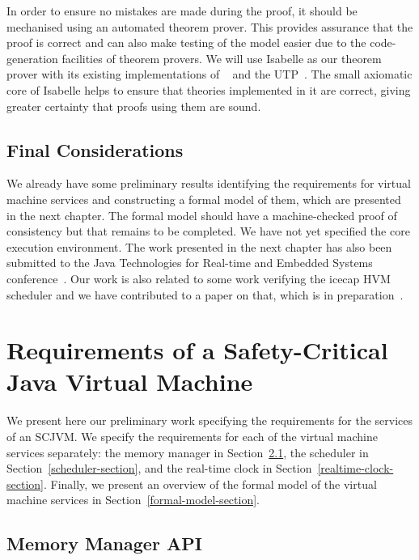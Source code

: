 \documentclass[a4paper,10pt]{report}
\begin{document}
In order to ensure no mistakes are made during the proof, it should be
mechanised using an automated theorem prover.
This provides assurance that the proof is correct and can also make
testing of the model easier due to the code-generation facilities of
theorem provers.
We will use Isabelle as our theorem prover with its existing
implementations of \Circus{}~\cite{feliachi2012} and the
UTP~\cite{foster2015}.
The small axiomatic core of Isabelle helps to ensure that theories
implemented in it are correct, giving greater certainty that proofs
using them are sound.

\section{Final Considerations}

We already have some preliminary results identifying the requirements
for virtual machine services and constructing a formal model of them,
which are presented in the next chapter.
The formal model should have a machine-checked proof of consistency
but that remains to be completed.
We have not yet specified the core execution environment.
The work presented in the next chapter has also been submitted to the
Java Technologies for Real-time and Embedded Systems
conference~\cite{baxter2015submitted}.
Our work is also related to some work verifying the icecap HVM
scheduler and we have contributed to a paper on that, which is in
preparation~\cite{freitas2015inpreparation}.

\chapter{Requirements of a Safety-Critical Java Virtual Machine}
\label{requirements-chapter}

We present here our preliminary work specifying the requirements for
the services of an SCJVM.
We specify the requirements for each of the virtual machine services
separately: the memory manager in
Section~\ref{memory-manager-section}, the scheduler in
Section~\ref{scheduler-section}, and the real-time clock in
Section~\ref{realtime-clock-section}.
Finally, we present an overview of the formal model of the virtual
machine services in Section~\ref{formal-model-section}.

\section{Memory Manager API}
\label{memory-manager-section}
\end{document}
